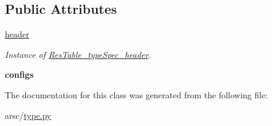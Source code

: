 \subsection*{Public Attributes}
\begin{DoxyCompactItemize}
\item 
\mbox{\label{classtype_1_1ResTable__typeSpec_a8a884ae739ae7024e8538644315297cb}} 
\mbox{\hyperlink{classtype_1_1ResTable__typeSpec_a8a884ae739ae7024e8538644315297cb}{header}}
\begin{DoxyCompactList}\small\item\em Instance of \mbox{\hyperlink{classtype_1_1ResTable__typeSpec__header}{Res\+Table\+\_\+type\+Spec\+\_\+header}}. \end{DoxyCompactList}\item 
\mbox{\label{classtype_1_1ResTable__typeSpec_a30e2b997c56f08845d4ff3d41dfab4ff}} 
{\bfseries configs}
\end{DoxyCompactItemize}


The documentation for this class was generated from the following file\+:\begin{DoxyCompactItemize}
\item 
arsc/\mbox{\hyperlink{type_8py}{type.\+py}}\end{DoxyCompactItemize}
